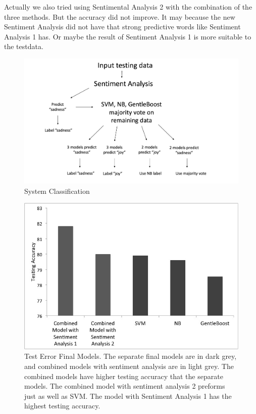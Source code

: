 \documentclass[]{article}
\begin{document}
Actually we also tried using Sentimental Analysis 2 with the combination of the three methods. But the accuracy did not improve. It may because the new Sentiment Analysis did not have that strong predictive words like Sentiment Analysis 1 has. Or maybe the result of Sentiment Analysis 1 is more suitable to the testdata.


\begin{figure}
	\centering
  \includegraphics[scale=0.4]{Method.jpg}
  \caption{System Classification}
  \label{fig:System Classification}
\end{figure}

\begin{figure}
	\centering
  \includegraphics[scale=0.4]{FinalGraph.jpg}
  \caption{Test Error Final Models. The separate final models are in dark grey, and combined models with sentiment analysis are in light grey. The combined models have higher testing accuracy that the separate models. The combined model with sentiment analysis 2 preforms just as well as SVM. The model with Sentiment Analysis 1 has the highest testing accuracy.}
  \label{fig:Test Error}
\end{figure}
\end{document}
